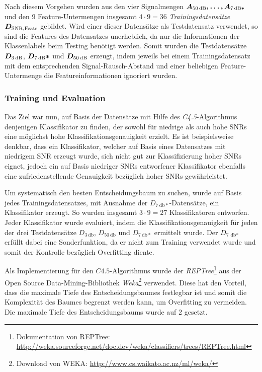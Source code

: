 Nach diesem Vorgehen wurden aus den vier Signalmengen $\boldmath{A_{\SI{50}{\decibel}}}, \ldots , \boldmath{A_{\SI{7}{\decibel}*}}$ und den 9 Feature-Untermengen insgesamt $4 \cdot 9 = 36$ \emph{Trainingsdatensätze} $\boldmath{D_{\text{SNR,Feats}}}$ gebildet. Wird einer dieser Datensätze als Testdatensatz verwendet, so sind die Features des Datensatzes unerheblich, da nur die Informationen der Klassenlabels beim Testing benötigt werden. Somit wurden die Testdatensätze $\boldmath{D_{\SI{3}{\decibel}}}$, $\boldmath{D_{\SI{7}{\decibel}}*}$ und $\boldmath{D_{\SI{50}{\decibel}}}$ erzeugt, indem jeweils bei einem Trainingsdatensatz mit dem entsprechenden Signal-Rausch-Abstand und einer beliebigen Feature-Untermenge die Featureinformationen ignoriert wurden.

\subsubsection{Training und Evaluation}
\label{sec:vad_training}

Das Ziel war nun, auf Basis der Datensätze mit Hilfe des \emph{C4.5}-Algorithmus denjenigen Klassifikator zu finden, der sowohl für niedrige als auch hohe SNRs eine möglichst hohe Klassifikationsgenauigkeit erzielt. Es ist beispielsweise denkbar, dass ein Klassifikator, welcher auf Basis eines Datensatzes mit niedrigem SNR erzeugt wurde, sich nicht gut zur Klassifizierung hoher SNRs eignet, jedoch ein auf Basis niedriger SNRs entworfener Klassifikator ebenfalls eine zufriedenstellende Genauigkeit bezüglich hoher SNRs gewährleistet.

Um systematisch den besten Entscheidungsbaum zu suchen, wurde auf Basis jedes Trainingsdatensatzes, mit Ausnahme der $D_{\SI{7}{\decibel}*}$-Datensätze, ein Klassifikator erzeugt. So wurden insgesamt $3 \cdot 9 = 27$ Klassifikatoren entworfen. Jeder Klassifikator wurde evaluiert, indem die Klassifikationsgenauigkeit für jeden der drei Testdatensätze $D_{\SI{3}{\decibel}}$, $D_{\SI{50}{\decibel}}$ und $D_{\SI{7}{\decibel}*}$ ermittelt wurde. Der $D_{\SI{7}{\decibel*}}$ erfüllt dabei eine Sonderfunktion, da er nicht zum Training verwendet wurde und somit der Kontrolle bezüglich Overfitting diente.

Als Implementierung für den $C4.5$-Algorithmus wurde der \emph{REPTree}\footnote{Dokumentation von REPTree: \url{http://weka.sourceforge.net/doc.dev/weka/classifiers/trees/REPTree.html}} aus der Open Source Data-Mining-Bibliothek \emph{Weka}\footnote{Download von WEKA: \url{http://www.cs.waikato.ac.nz/ml/weka/}} verwendet. Diese hat den Vorteil, dass die maximale Tiefe des Entscheidungsbaumes festlegbar ist und somit die Komplexität des Baumes begrenzt werden kann, um Overfitting zu vermeiden. Die maximale Tiefe des Entscheidungsbaums wurde auf 2 gesetzt. 

